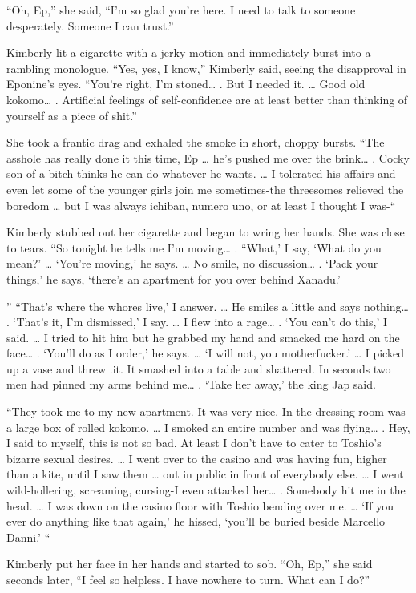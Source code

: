 \documentclass[]{article}
\begin{document}
{“Oh, Ep,” she said, “I’m so glad you’re here.  I need to talk to someone desperately.  Someone I can trust.”

Kimberly lit a cigarette with a jerky motion and immediately burst into a rambling monologue.  “Yes, yes, I know,” Kimberly said, seeing the disapproval in Eponine’s eyes.  “You’re right, I’m stoned… .  But I needed it.  … Good old kokomo… .  Artificial feelings of self-confidence are at least better than thinking of yourself as a piece of shit.”

She took a frantic drag and exhaled the smoke in short, choppy bursts.  “The asshole has really done it this time, Ep … he’s pushed me over the brink… .  Cocky son of a bitch-thinks he can do whatever he wants.  … I tolerated his affairs and even let some of the younger girls join me sometimes-the threesomes relieved the boredom … but I was always ichiban, numero uno, or at least I thought I was-“

Kimberly stubbed out her cigarette and began to wring her hands.  She was close to tears.  “So tonight he tells me I’m moving… .  “What,’ I say, ‘What do you mean?’ … ‘You’re moving,’ he says.  … No smile, no discussion… .  ‘Pack your things,’ he says, ‘there’s an apartment for you over behind Xanadu.’

” “That’s where the whores live,’ I answer.  … He smiles a little and says nothing… .  ‘That’s it, I’m dismissed,’ I say.  … I flew into a rage… .  ‘You can’t do this,’ I said.  … I tried to hit him but he grabbed my hand and smacked me hard on the face… .  ‘You’ll do as I order,’ he says.  … ‘I will not, you motherfucker.’ … I picked up a vase and threw .it.  It smashed into a table and shattered.  In seconds two men had pinned my arms behind me… .  ‘Take her away,’ the king Jap said.

“They took me to my new apartment.  It was very nice.  In the dressing room was a large box of rolled kokomo.  … I smoked an entire number and was flying… .  Hey, I said to myself, this is not so bad.  At least I don’t have to cater to Toshio’s bizarre sexual desires.  … I went over to the casino and was having fun, higher than a kite, until I saw them … out in public in front of everybody else.  … I went wild-hollering, screaming, cursing-I even attacked her… .  Somebody hit me in the head.  … I was down on the casino floor with Toshio bending over me.  … ‘If you ever do anything like that again,’ he hissed, ‘you’ll be buried beside Marcello Danni.’ “

Kimberly put her face in her hands and started to sob.  “Oh, Ep,” she said seconds later, “I feel so helpless.  I have nowhere to turn.  What can I do?”

}
\end{document}
